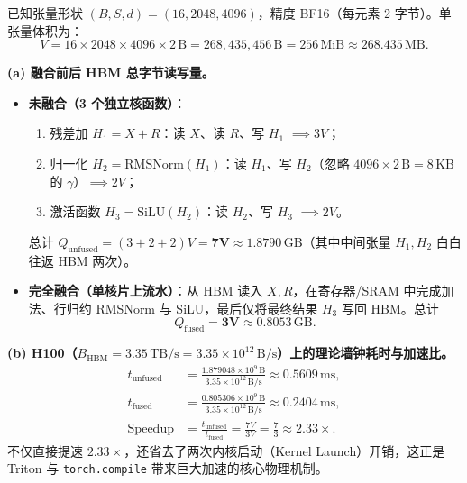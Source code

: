
已知张量形状 $(B, S, d) = (16, 2048, 4096)$，精度 BF16（每元素 2 字节）。单张量体积为：
\[
  V = 16 \times 2048 \times 4096 \times 2\,\mathrm{B} = 268{,}435{,}456\,\mathrm{B} = 256\,\mathrm{MiB} \approx \mathbf{268.435\,\mathrm{MB}}.
\]

\textbf{(a) 融合前后 HBM 总字节读写量。}
\begin{itemize}
  \item \textbf{未融合（3 个独立核函数）}：
  \begin{enumerate}
    \item 残差加 $H_1 = X + R$：读 $X$、读 $R$、写 $H_1$ $\implies 3V$；
    \item 归一化 $H_2 = \mathrm{RMSNorm}(H_1)$：读 $H_1$、写 $H_2$（忽略 $4096 \times 2\,\mathrm{B} = 8\,\mathrm{KB}$ 的 $\gamma$）$\implies 2V$；
    \item 激活函数 $H_3 = \mathrm{SiLU}(H_2)$：读 $H_2$、写 $H_3$ $\implies 2V$。
  \end{enumerate}
  总计 $Q_{\mathrm{unfused}} = (3 + 2 + 2)V = \mathbf{7V \approx 1.8790\,\mathrm{GB}}$（其中中间张量 $H_1, H_2$ 白白往返 HBM 两次）。
  \item \textbf{完全融合（单核片上流水）}：从 HBM 读入 $X, R$，在寄存器/SRAM 中完成加法、行归约 RMSNorm 与 SiLU，最后仅将最终结果 $H_3$ 写回 HBM。总计
  \[
    Q_{\mathrm{fused}} = \mathbf{3V \approx 0.8053\,\mathrm{GB}}.
  \]
\end{itemize}

\textbf{(b) H100（$B_{\mathrm{HBM}} = 3.35\,\mathrm{TB/s} = 3.35 \times 10^{12}\,\mathrm{B/s}$）上的理论墙钟耗时与加速比。}
\begin{align*}
  t_{\mathrm{unfused}} &= \frac{1.879048 \times 10^9\,\mathrm{B}}{3.35 \times 10^{12}\,\mathrm{B/s}} \approx \mathbf{0.5609\,\mathrm{ms}}, \\
  t_{\mathrm{fused}} &= \frac{0.805306 \times 10^9\,\mathrm{B}}{3.35 \times 10^{12}\,\mathrm{B/s}} \approx \mathbf{0.2404\,\mathrm{ms}}, \\
  \mathrm{Speedup} &= \frac{t_{\mathrm{unfused}}}{t_{\mathrm{fused}}} = \frac{7V}{3V} = \frac{7}{3} \approx \mathbf{2.33\times}.
\end{align*}
不仅直接提速 $2.33\times$，还省去了两次内核启动（Kernel Launch）开销，这正是 Triton 与 \texttt{torch.compile} 带来巨大加速的核心物理机制。


